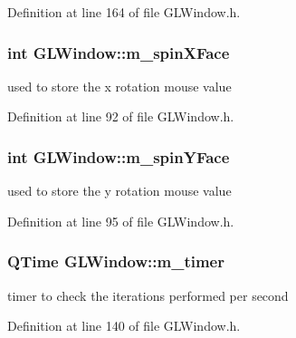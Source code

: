 Definition at line 164 of file GLWindow.h.

\hypertarget{class_g_l_window_af8ea09020a5ad4c20a16ea835ed1f2af}{
\subsubsection[{m\_\-spinXFace}]{\setlength{\rightskip}{0pt plus 5cm}int {\bf GLWindow::m\_\-spinXFace}}}
\label{class_g_l_window_af8ea09020a5ad4c20a16ea835ed1f2af}


used to store the x rotation mouse value 



Definition at line 92 of file GLWindow.h.

\hypertarget{class_g_l_window_aa4c39badfa80d8eac6a773449b6db5a2}{
\subsubsection[{m\_\-spinYFace}]{\setlength{\rightskip}{0pt plus 5cm}int {\bf GLWindow::m\_\-spinYFace}}}
\label{class_g_l_window_aa4c39badfa80d8eac6a773449b6db5a2}


used to store the y rotation mouse value 



Definition at line 95 of file GLWindow.h.

\hypertarget{class_g_l_window_abc5b1376741572d8c02860eafbfd008c}{
\subsubsection[{m\_\-timer}]{\setlength{\rightskip}{0pt plus 5cm}QTime {\bf GLWindow::m\_\-timer}}}
\label{class_g_l_window_abc5b1376741572d8c02860eafbfd008c}


timer to check the iterations performed per second 



Definition at line 140 of file GLWindow.h.

